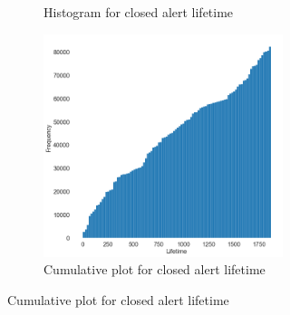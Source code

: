 \begin{figure}[h]
\begin{subfigure}{1\textwidth}
\begin{subfigure}{.5\textwidth}
			\caption{Histogram for closed alert lifetime}
		\end{subfigure}%
		\begin{subfigure}{.5\textwidth}
			\centering
			\includegraphics[scale=0.3]{./src/data_analysis/alert_lifetime_cumulative.png}
			\caption{Cumulative plot for closed alert lifetime}
		\end{subfigure}
	\end{subfigure}
	\caption{}
	\label{closed_alerts:lifetime}
\end{figure}



